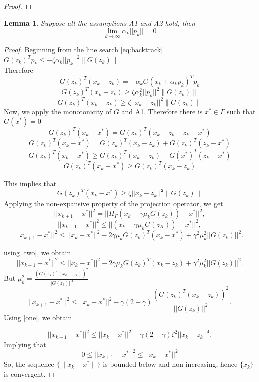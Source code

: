 \documentclass{article}
\newtheorem{lemma}{Lemma}
\theoremstyle{remark}
\begin{document}
{\begin{proof}
\end{proof}

\begin{lemma}
\label{lemmA1}
    Suppose all the assumptions A1 and A2 hold, then \[\lim_{k\rightarrow \infty}\alpha_k||p_k||=0\]
\end{lemma}
    
\begin{proof}
    Beginning from the line search \eqref{eq:backtrack} $ G(z_k)^Tp_k\leq -\zeta \alpha_k||p_k||^2 \|G(z_k)\|$\\ Therefore 
    \[
    G(z_k)^T(x_k-z_k)=-\alpha_kG(x_k+\alpha_kp_k)^Tp_k
    \]
    \[
    G(z_k)^T(x_k-z_k)\geq \zeta \alpha_k^2||p_k||^2\|G(z_k)\|
    \]
     \begin{equation}\label{one}
         G(z_k)^T(x_k-z_k)\geq \zeta ||x_k-z_k||^2\|G(z_k)\|
     \end{equation}
 Now, we apply the monotonicity of $G$ and A1. Therefore there is $x^*\in \Gamma$ such that $G(x^*)=0$ \\
    \[
    G(z_k)^T(x_k-x^*)=G(z_k)^T(x_k-z_k+z_k-x^*)
    \]
    \[
    G(z_k)^T(x_k-x^*)=G(z_k)^T(x_k-z_k)+G(z_k)^T(z_k-x^*)
    \]
    \[
    G(z_k)^T(x_k-x^*)\geq G(z_k)^T(x_k-z_k)+G(x^*)^T(z_k-x^*)
    \]
     \begin{equation}\label{two}
          G(z_k)^T(x_k-x^*)\geq G(z_k)^T(x_k-z_k)
     \end{equation}
    
    This implies that
    \begin{equation}\label{three}
       G(z_k)^T(x_k-x^*)\geq \zeta ||x_k-z_k||^2 \|G(z_k)\|
    \end{equation}
    Applying the non-expansive property of the projection operator, we get
    \[
   || x_{k+1}-x^*||^2=||\Pi_{\Gamma}(x_k- \gamma\mu_kG(z_k))-x^*||^2,
    \]
    \[
   || x_{k+1}-x^*||^2\leq ||(x_k- \gamma\mu_kG(z_K))-x^*||^2,
    \]
     \[
   || x_{k+1}-x^*||^2\leq ||x_k-x^*||^2-2 \gamma\mu_kG(z_k)^T(x_k-x^*)+\gamma^2\mu_k^2||G(z_k)||^2.
    \]
   
    using \eqref{two}, we obtain
     \[
         || x_{k+1}-x^*||^2\leq ||x_k-x^*||^2- 2\gamma\mu_kG(z_k)^T(x_k-z_k)+\gamma^2\mu_k^2||G(z_k)||^2.
     \]
     But $\mu_k^2=\frac{(G(z_k)^T(x_k-z_k))^2}{||G(z_k)||^4}$
   \[
         || x_{k+1}-x^*||^2\leq ||x_k-x^*||^2- \gamma(2-\gamma)\frac{(G(z_k)^T(x_k-z_k))^2}{||G(z_k)||^2}.
     \]
     Using \eqref{one}, we obtain 
    
    \begin{equation}\label{five}
       || x_{k+1}-x^*||^2\leq ||x_k-x^*||^2- \gamma(2-\gamma)\zeta^2 ||x_k-z_k||^4.
    \end{equation}
    Implying that 
    \begin{equation}
       0\leq || x_{k+1}-x^*||^2\leq ||x_k-x^*||^2
    \end{equation}
 So, the sequence $\{\|x_k-x^*\|\}$  is bounded below and non-increasing, hence $\{x_k\}$ is convergent.


\end{proof}}
\end{document}
